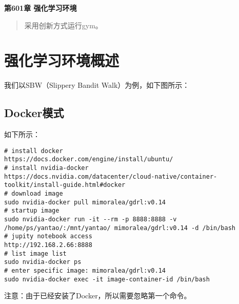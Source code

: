 \newpage
\maketitle
\begin{center}
\Large \textbf{第601章 强化学习环境} \quad 
\end{center}
\begin{abstract}
采用创新方式运行gym。
\end{abstract}
\section{强化学习环境概述}
我们以SBW（Slippery Bandit Walk）为例，如下图所示：
\subsection{Docker模式}
如下所示：
\begin{lstlisting}
# install docker
https://docs.docker.com/engine/install/ubuntu/
# install nvidia-docker
https://docs.nvidia.com/datacenter/cloud-native/container-toolkit/install-guide.html#docker
# download image
sudo nvidia-docker pull mimoralea/gdrl:v0.14
# startup image
sudo nvidia-docker run -it --rm -p 8888:8888 -v /home/ps/yantao/:/mnt/yantao/ mimoralea/gdrl:v0.14 -d /bin/bash
# jupity notebook access
http://192.168.2.66:8888
# list image list
sudo nvidia-docker ps
# enter specific image: mimoralea/gdrl:v0.14
sudo nvidia-docker exec -it image-container-id /bin/bash
\end{lstlisting}
注意：由于已经安装了Docker，所以需要忽略第一个命令。